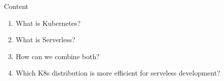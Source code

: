 \begin{frame}{Content}

\begin{enumerate}
    \item<1-> What is Kubernetes?
    \item<2-> What is Serverless?
    \item<3-> How can we combine both?
    \item<4-> Which K8s distribution is more efficient for serveless development?
\end{enumerate}

\end{frame}